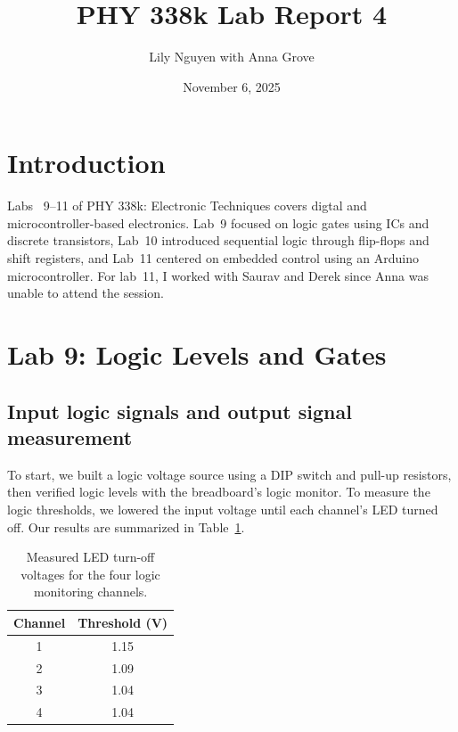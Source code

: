 \documentclass{article}
\title{PHY 338k Lab Report 4}
\author{Lily Nguyen with Anna Grove}
\date{November 6, 2025}
\begin{document}
\maketitle

\section{Introduction}

Labs ~9--11 of PHY 338k: Electronic Techniques covers digtal and
microcontroller-based electronics. Lab~9 focused on logic gates using ICs 
and discrete transistors, Lab~10 introduced sequential logic through
flip-flops and shift registers, and Lab~11 centered on embedded control
using an Arduino microcontroller. For lab~11, I worked with Saurav and
Derek since Anna was unable to attend the session.


\section{Lab 9: Logic Levels and Gates}

\subsection{Input logic signals and output signal measurement}

To start, we built a logic voltage source using a DIP switch and pull-up
resistors, then verified logic levels with the breadboard's logic monitor.
To measure the logic thresholds, we lowered the input voltage until each
channel's LED turned off. Our results are summarized in Table~\ref{tab:logic_thresh}.

\begin{table}[H]
    \centering
    \begin{tabular}{|c|c|}
        \hline
        Channel & Threshold (V) \\
        \hline
        1 & 1.15\\
        2 & 1.09\\
        3 & 1.04\\
        4 & 1.04\\
        \hline
    \end{tabular}
    \caption{Measured LED turn-off voltages for the four logic monitoring channels.}
    \label{tab:logic_thresh}
\end{table}
\end{document}
